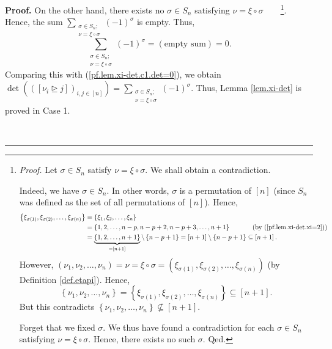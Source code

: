 \documentclass[numbers=enddot,12pt,final,onecolumn,notitlepage,english]{scrartcl}%
\theoremstyle{definition}
\newenvironment{proof}[1][Proof]{\noindent\textbf{#1.} }{\ \rule{0.5em}{0.5em}}
\let\sumnonlimits\sum
\renewcommand{\sum}{\sumnonlimits\limits}
\newenvironment{verlong}{}{}
\begin{document}
\begin{proof}
\begin{verlong}
On the other hand, there exists no $\sigma\in S_{n}$ satisfying $\nu=\xi
\circ\sigma$\ \ \ \ \footnote{\textit{Proof.} Let $\sigma\in S_{n}$ satisfy
$\nu=\xi\circ\sigma$. We shall obtain a contradiction.
\par
Indeed, we have $\sigma\in S_{n}$. In other words, $\sigma$ is a permutation
of $\left[  n\right]  $ (since $S_{n}$ was defined as the set of all
permutations of $\left[  n\right]  $). Hence,
\begin{align*}
\left\{  \xi_{\sigma\left(  1\right)  },\xi_{\sigma\left(  2\right)  }%
,\ldots,\xi_{\sigma\left(  n\right)  }\right\}   &  =\left\{  \xi_{1},\xi
_{2},\ldots,\xi_{n}\right\} \\
&  =\left\{  1,2,\ldots,n-p,n-p+2,n-p+3,\ldots,n+1\right\}
\ \ \ \ \ \ \ \ \ \ \left(  \text{by (\ref{pf.lem.xi-det.xi=2})}\right) \\
&  =\underbrace{\left\{  1,2,\ldots,n+1\right\}  }_{=\left[  n+1\right]
}\setminus\left\{  n-p+1\right\}  =\left[  n+1\right]  \setminus\left\{
n-p+1\right\}  \subseteq\left[  n+1\right]  .
\end{align*}
However, $\left(  \nu_{1},\nu_{2},\ldots,\nu_{n}\right)  =\nu=\xi\circ
\sigma=\left(  \xi_{\sigma\left(  1\right)  },\xi_{\sigma\left(  2\right)
},\ldots,\xi_{\sigma\left(  n\right)  }\right)  $ (by Definition
\ref{def.etapi}). Hence,
\[
\left\{  \nu_{1},\nu_{2},\ldots,\nu_{n}\right\}  =\left\{  \xi_{\sigma\left(
1\right)  },\xi_{\sigma\left(  2\right)  },\ldots,\xi_{\sigma\left(  n\right)
}\right\}  \subseteq\left[  n+1\right]  .
\]
But this contradicts $\left\{  \nu_{1},\nu_{2},\ldots,\nu_{n}\right\}
\not \subseteq \left[  n+1\right]  $.
\par
Forget that we fixed $\sigma$. We thus have found a contradiction for each
$\sigma\in S_{n}$ satisfying $\nu=\xi\circ\sigma$. Hence, there exists no such
$\sigma$. Qed.}. Hence, the sum $\sum_{\substack{\sigma\in S_{n};\\\nu
=\xi\circ\sigma}}\left(  -1\right)  ^{\sigma}$ is empty. Thus,%
\[
\sum_{\substack{\sigma\in S_{n};\\\nu=\xi\circ\sigma}}\left(  -1\right)
^{\sigma}=\left(  \text{empty sum}\right)  =0.
\]
Comparing this with (\ref{pf.lem.xi-det.c1.det=0}), we obtain $\det\left(
\left(  \left[  \nu_{i}\trianglerighteq j\right]  \right)  _{i,j\in\left[
n\right]  }\right)  =\sum_{\substack{\sigma\in S_{n};\\\nu=\xi\circ\sigma
}}\left(  -1\right)  ^{\sigma}$. Thus, Lemma \ref{lem.xi-det} is proved in
Case 1. \medskip
\end{verlong}


\end{proof}
\end{document}

